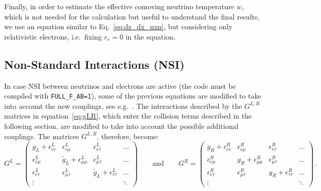 \documentclass[notitlepage,nofootinbib,showpacs,preprintnumbers,amsmath,amssymb,superscriptaddress,prd,onecolumn]{revtex4-1}
\begin{document}
Finally, in order to estimate the effective comoving neutrino temperature $w$, which is
not needed for the calculation but useful to understand the final results,
we use an equation similar to Eq.~\eqref{eq:dz_dx_nxn},
but considering only relativistic electrons, i.e.\ fixing $r_e=0$ in the equation.


\subsection{Non-Standard Interactions (NSI)}
\label{ssec:nsi}
In case NSI between neutrinos and electrons are active (the code must be compiled with \texttt{FULL\_F\_AB=1}),
some of the previous equations are modified to take into account the new couplings,
see e.g.~\cite{deSalas:2016ztq}.
The interactions described by the $G^{L,R}$ matrices in equation~\eqref{eq:gLR},
which enter the collision terms described in the following section,
are modified to take into account the possible additional couplings.
The matrices $G^{L,R}$, therefore, become:
\begin{equation}
\label{eq:gLR_nsi}
G^L
=
\left(
\begin{array}{cccc}
g_L+\epsilon^L_{ee} & \epsilon^L_{e\mu} & \epsilon^L_{e\tau} &\ldots \\
\epsilon^L_{e\mu} & \tilde g_L + \epsilon^L_{\mu\mu} & \epsilon^L_{\mu\tau} &\ldots \\
\epsilon^L_{e\tau} & \epsilon^L_{\mu\tau} & \tilde g_L + \epsilon^L_{\tau\tau} &\ldots \\
\vdots&&&\ddots
\end{array}
\right)
\qquad
\text{and}
\qquad
G^R
=
\left(
\begin{array}{cccc}
g_R+\epsilon^R_{ee} & \epsilon^R_{e\mu} & \epsilon^R_{e\tau} &\ldots \\
\epsilon^R_{e\mu} & g_R + \epsilon^R_{\mu\mu} & \epsilon^R_{\mu\tau} &\ldots \\
\epsilon^R_{e\tau} & \epsilon^R_{\mu\tau} & g_R + \epsilon^R_{\tau\tau} &\ldots \\
\vdots&&&\ddots
\end{array}
\right)
\,.
\end{equation}
\end{document}
